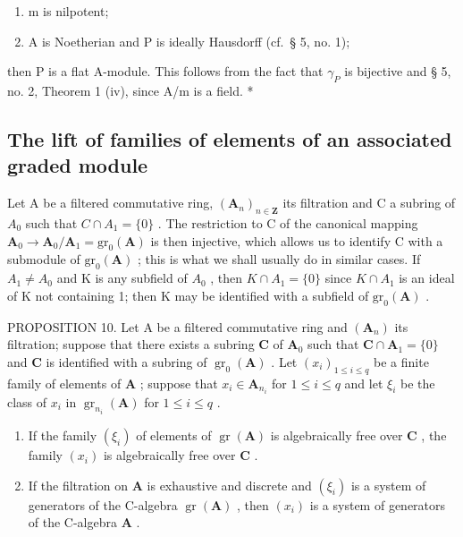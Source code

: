\begin{enumerate}
\def\labelenumi{(\arabic{enumi})}
\item
  m is nilpotent;
\item
  A is Noetherian and P is ideally Hausdorff (cf.~§ 5, no. 1);
\end{enumerate}

then P is a flat A-module. This follows from the fact that \(\gamma_{P}\) is bijective and § 5, no. 2, Theorem 1 (iv), since A/m is a field. *

\subsection{The lift of families of elements of an associated graded module}

Let A be a filtered commutative ring, \((\mathbf{A}_{n})_{n\in\mathbf{Z}}\) its filtration and C a subring of \(A_{0}\) such that \(C\cap A_{1}=\{0\}\) . The restriction to C of the canonical mapping \(\mathbf{A}_{0}\to\mathbf{A}_{0}/\mathbf{A}_{1}=\mathrm{gr}_{0}(\mathbf{A})\) is then injective, which allows us to identify C with a submodule of \(\mathrm{gr}_{0}(\mathbf{A})\) ; this is what we shall usually do in similar cases. If \(A_{1}\neq A_{0}\) and K is any subfield of \(A_{0}\) , then \(K\cap A_{1}=\{0\}\) since \(K\cap A_{1}\) is an ideal of K not containing 1; then K may be identified with a subfield of \(\mathrm{gr}_{0}(\mathbf{A})\) .

PROPOSITION 10. Let A be a filtered commutative ring and \((\mathbf{A}_n)\) its filtration; suppose that there exists a subring \(\mathbf{C}\) of \(\mathbf{A}_0\) such that \(\mathbf{C} \cap \mathbf{A}_1 = \{0\}\) and \(\mathbf{C}\) is identified with a subring of \(\operatorname{gr}_0(\mathbf{A})\) . Let \((x_i)_{1 \leqslant i \leqslant q}\) be a finite family of elements of \(\mathbf{A}\) ; suppose that \(x_i \in \mathbf{A}_{n_i}\) for \(1 \leqslant i \leqslant q\) and let \(\xi_i\) be the class of \(x_i\) in \(\operatorname{gr}_{n_i}(\mathbf{A})\) for \(1 \leqslant i \leqslant q\) .

\begin{enumerate}
\def\labelenumi{(\roman{enumi})}
\item
  If the family \((\xi_{i})\) of elements of \(\operatorname{gr}(\mathbf{A})\) is algebraically free over \(\mathbf{C}\) , the family \((x_{i})\) is algebraically free over \(\mathbf{C}\) .
\item
  If the filtration on \(\mathbf{A}\) is exhaustive and discrete and \((\xi_{i})\) is a system of generators of the C-algebra \(\operatorname{gr}(\mathbf{A})\) , then \((x_{i})\) is a system of generators of the C-algebra \(\mathbf{A}\) .
\end{enumerate}

